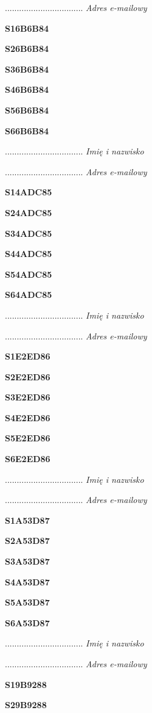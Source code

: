 .................................
\textit{Adres e-mailowy}

\Large \textbf{S16B6B84}

\Large \textbf{S26B6B84}

\Large \textbf{S36B6B84}

\Large \textbf{S46B6B84}

\Large \textbf{S56B6B84}

\Large \textbf{S66B6B84}

.................................
\textit{Imię i nazwisko}

.................................
\textit{Adres e-mailowy}

\Large \textbf{S14ADC85}

\Large \textbf{S24ADC85}

\Large \textbf{S34ADC85}

\Large \textbf{S44ADC85}

\Large \textbf{S54ADC85}

\Large \textbf{S64ADC85}

.................................
\textit{Imię i nazwisko}

.................................
\textit{Adres e-mailowy}

\Large \textbf{S1E2ED86}

\Large \textbf{S2E2ED86}

\Large \textbf{S3E2ED86}

\Large \textbf{S4E2ED86}

\Large \textbf{S5E2ED86}

\Large \textbf{S6E2ED86}

.................................
\textit{Imię i nazwisko}

.................................
\textit{Adres e-mailowy}

\Large \textbf{S1A53D87}

\Large \textbf{S2A53D87}

\Large \textbf{S3A53D87}

\Large \textbf{S4A53D87}

\Large \textbf{S5A53D87}

\Large \textbf{S6A53D87}

.................................
\textit{Imię i nazwisko}

.................................
\textit{Adres e-mailowy}

\Large \textbf{S19B9288}

\Large \textbf{S29B9288}


